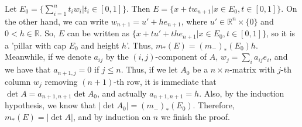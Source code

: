 \documentclass{article}
\newcommand{\ReR}{\mathbb{R}}
\newcommand{\SBar}{|}
\begin{document}
Let $E_0 = \{ \sum_{i = 1}^n t_i w_i \SBar t_i \in [0, 1] \}$.
Then $E = \{ x + tw_{n + 1} \SBar x \in E_0, t \in [0, 1] \}$.
On the other hand, we can write $w_{n + 1} = u' + h e_{n + 1}$, where $u' \in \ReR^n \times \{0\}$ and $0 < h \in \ReR$.
So, $E$ can be written as $\{ x + tu' + the_{n + 1} \SBar x \in E_0, t \in [0, 1] \}$, so it is a 'pillar with cap $E_0$ and height $h$'.
Thus, $m_*(E) = (m_-)_*(E_0) h$.
Meanwhile, if we denote $a_{ij}$ by the $(i, j)$-component of $A$, $w_j = \sum_i a_{ij} e_i$, and we have that $a_{n + 1, j} = 0$ if $j \le n$.
Thus, if we let $A_0$ be a $n \times n$-matrix with $j$-th column $w_j$ removing $(n + 1)$-th row, it is immediate that $\det{A} = a_{n + 1, n + 1} \det{A_0}$, and actually $a_{n + 1, n + 1} = h$.
Also, by the induction hypothesis, we know that $|\det{A_0}| = (m_-)_*(E_0)$.
Therefore, $m_*(E) = |\det{A}|$, and by induction on $n$ we finish the proof.
\end{document}
